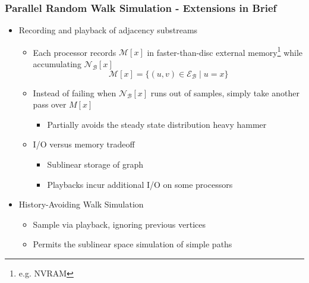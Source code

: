\documentclass{beamer}
\begin{document}
\begin{frame}
\frametitle{Parallel Random Walk Simulation - Extensions in Brief}


\begin{itemize}
	\item Recording and playback of adjacency substreams
	\begin{itemize}
		\item Each processor records $\mathcal{M}[x]$ in faster-than-disc external memory\footnote{e.g. NVRAM} while accumulating $\mathcal{N}_\mathcal{B}[x]$
		\begin{equation*}
			\mathcal{M}[x] = \{ (u, v) \in \mathcal{E}_\mathcal{B} \mid u = x\}
		\end{equation*}
		\item Instead of failing when $\mathcal{N}_\mathcal{B}[x]$ runs out of samples, simply take another pass over $M[x]$
		\begin{itemize}
			\item Partially avoids the steady state distribution heavy hammer		
		\end{itemize}
		\item I/O versus memory tradeoff
		\begin{itemize}
			\item Sublinear storage of graph
			\item Playbacks incur additional I/O on some processors
		\end{itemize}
	\end{itemize}
	\item History-Avoiding Walk Simulation
	\begin{itemize}
		\item Sample via playback, ignoring previous vertices
		\item Permits the sublinear space simulation of simple paths
	\end{itemize}
\end{itemize}





\end{frame}



\end{document}
